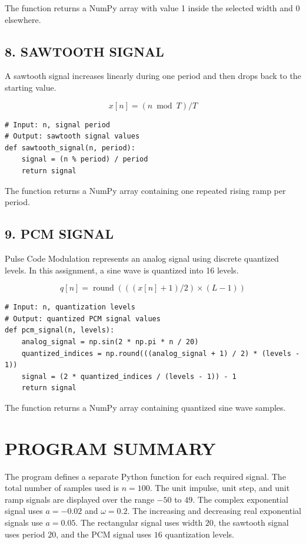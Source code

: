 \documentclass[12pt,a4paper]{article}
\begin{document}
The function returns a NumPy array with value 1 inside the selected width and 0 elsewhere.

\subsection*{8. SAWTOOTH SIGNAL}

A sawtooth signal increases linearly during one period and then drops back to the starting value.

\[
x[n] = (n \bmod T) / T
\]

\begin{lstlisting}[style=pythoncode]
# Input: n, signal period
# Output: sawtooth signal values
def sawtooth_signal(n, period):
    signal = (n % period) / period
    return signal
\end{lstlisting}

The function returns a NumPy array containing one repeated rising ramp per period.

\subsection*{9. PCM SIGNAL}

Pulse Code Modulation represents an analog signal using discrete quantized levels. In this assignment, a sine wave is quantized into 16 levels.

\[
q[n] = \operatorname{round}\left(((x[n] + 1) / 2) \times (L - 1)\right)
\]

\begin{lstlisting}[style=pythoncode]
# Input: n, quantization levels
# Output: quantized PCM signal values
def pcm_signal(n, levels):
    analog_signal = np.sin(2 * np.pi * n / 20)
    quantized_indices = np.round(((analog_signal + 1) / 2) * (levels - 1))
    signal = (2 * quantized_indices / (levels - 1)) - 1
    return signal
\end{lstlisting}

The function returns a NumPy array containing quantized sine wave samples.

\section*{PROGRAM SUMMARY}

The program defines a separate Python function for each required signal. The total number of samples used is \(n = 100\). The unit impulse, unit step, and unit ramp signals are displayed over the range \(-50\) to \(49\). The complex exponential signal uses \(a = -0.02\) and \(\omega = 0.2\). The increasing and decreasing real exponential signals use \(a = 0.05\). The rectangular signal uses width \(20\), the sawtooth signal uses period \(20\), and the PCM signal uses \(16\) quantization levels.
\end{document}
